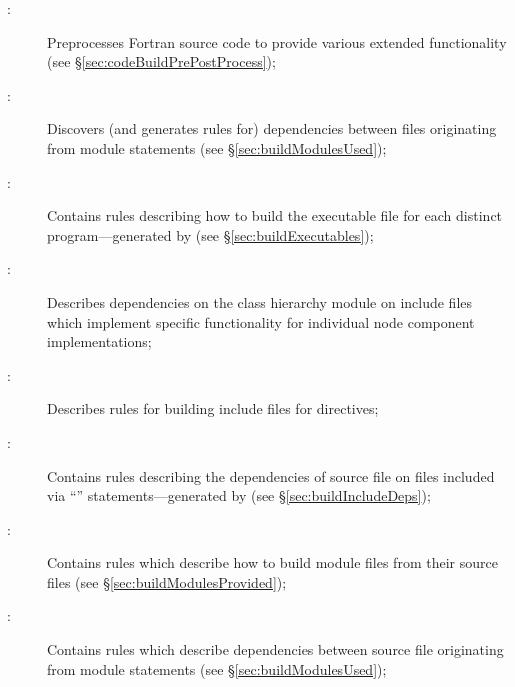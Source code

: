 \begin{description}
\item[:] Preprocesses Fortran source code to provide various extended functionality (see \S\ref{sec:codeBuildPrePostProcess});

\item[:] Discovers (and generates rules for) dependencies between files originating from module  statements (see \S\ref{sec:buildModulesUsed});
  
\item[:] Contains rules describing how to build the executable file for each distinct program---generated by  (see \S\ref{sec:buildExecutables});

\item[:] Describes dependencies on the  class hierarchy module on include files which implement specific functionality for individual node component implementations;
  
\item[:] Describes rules for building include files for  directives;

\item[:] Contains rules describing the dependencies of source file on files included via ``'' statements---generated by  (see \S\ref{sec:buildIncludeDeps});

\item[:] Contains rules which describe how to build module files from their source files (see \S\ref{sec:buildModulesProvided});

\item[:] Contains rules which describe dependencies between source file originating from module  statements (see \S\ref{sec:buildModulesUsed});


\end{description}
